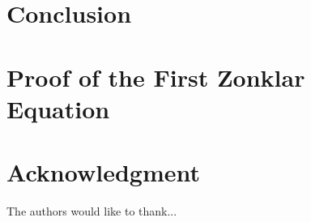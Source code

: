 \documentclass[conference]{IEEEtran}
\begin{document}
{\section{Conclusion}
\blindtext






%


\appendices
\section{Proof of the First Zonklar Equation}
\blindtext

\section*{Acknowledgment}


The authors would like to thank...


\ifCLASSOPTIONcaptionsoff
  \newpage
\fi




}
\end{document}
